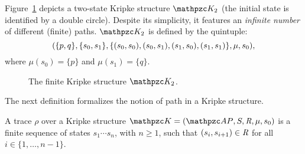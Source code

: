\begin{example} \label{ex:kripke1}
Figure~\ref{K2} depicts a two-state Kripke structure 
$\Ku_2$ (the initial state is identified by a double circle).
Despite its simplicity, it features an \emph{infinite number} of different (finite) 
paths. 
%
$\Ku_2$ is defined by the 
quintuple:
\[(\{p,q\},\{s_0,s_1\},\{(s_0,s_0),(s_0,s_1),(s_1,s_0),(s_1,s_1)\},\mu,s_0),\]
where $\mu(s_0)=\{p\}$ and $\mu(s_1)=\{q\}$.
\begin{figure}[H]
\centering
{}
\caption{The finite Kripke structure $\Ku_2$.}\label{K2}
\end{figure}
\end{example}

The next definition formalizes the notion of path in a Kripke structure.
\begin{definition}
A trace $\rho$ over a Kripke structure $\Ku=\KuDef$ is a finite sequence of states $s_1\cdots s_n$, with $n\geq 1$, such that $(s_i,s_{i+1})\in \textit{R}$ for all $i\in\{1,\ldots ,n-1\}$.
\end{definition}

